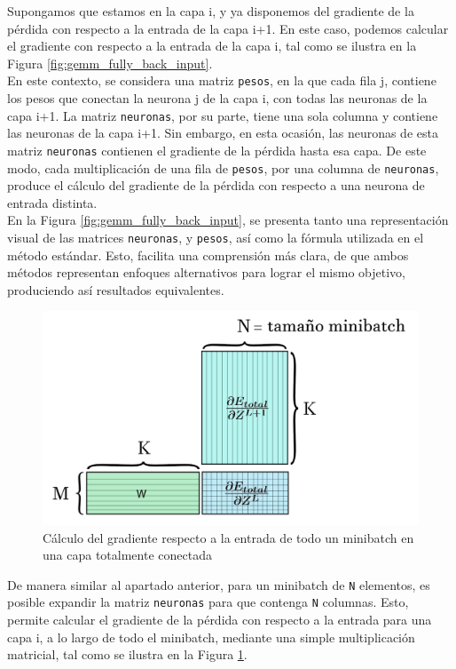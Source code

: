 Supongamos que estamos en la capa i, y ya disponemos del gradiente de la pérdida con respecto a la entrada de la capa i+1. En este caso, podemos calcular el gradiente con respecto a la entrada de la capa i, tal como se ilustra en la Figura \ref{fig:gemm_fully_back_input}. \\
En este contexto, se considera una matriz \texttt{pesos}, en la que cada fila j, contiene los pesos que conectan la neurona j de la capa i, con todas las neuronas de la capa i+1. La matriz \texttt{neuronas}, por su parte, tiene una sola columna y contiene las neuronas de la capa i+1. Sin embargo, en esta ocasión, las neuronas de esta matriz \texttt{neuronas} contienen el gradiente de la pérdida hasta esa capa. De este modo, cada multiplicación de una fila de \texttt{pesos}, por una columna de \texttt{neuronas}, produce el cálculo del gradiente de la pérdida con respecto a una neurona de entrada distinta. \\
En la Figura \ref{fig:gemm_fully_back_input}, se presenta tanto una representación visual de las matrices \texttt{neuronas}, y \texttt{pesos}, así como la fórmula utilizada en el método estándar. Esto, facilita una comprensión más clara, de que ambos métodos representan enfoques alternativos para lograr el mismo objetivo, produciendo así resultados equivalentes.

\begin{figure}[H]
	\centering
	\includegraphics[scale=0.25]{imagenes/gemm_fully_back_input_minibatch.jpg}  
	\caption{Cálculo del gradiente respecto a la entrada de todo un minibatch en una capa totalmente conectada}
	\label{fig:gemm_fully_back_input_minibatch}
\end{figure}

De manera similar al apartado anterior, para un minibatch de \texttt{N} elementos, es posible expandir la matriz \texttt{neuronas} para que contenga \texttt{N} columnas. Esto, permite calcular el gradiente de la pérdida con respecto a la entrada para una capa i, a lo largo de todo el minibatch, mediante una simple multiplicación matricial, tal como se ilustra en la Figura \ref{fig:gemm_fully_back_input_minibatch}.


